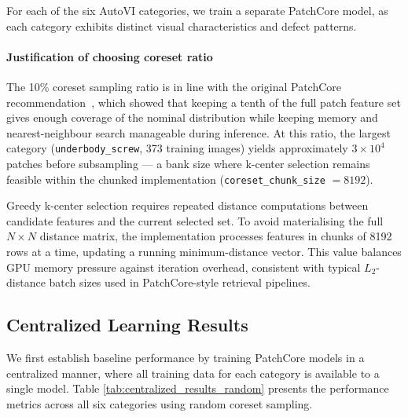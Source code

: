 \documentclass{article}
\begin{document}
For each of the six AutoVI categories, we train a separate PatchCore model, as each category exhibits distinct visual characteristics and defect patterns.

\paragraph*{Justification of choosing coreset ratio}

The 10\% coreset sampling ratio is in line with the original PatchCore 
recommendation~\citep{Roth2022TotalRecall}, which showed that keeping 
a tenth of the full patch feature set gives enough coverage of the 
nominal distribution while keeping memory and nearest-neighbour search 
manageable during inference. At this ratio, the largest category 
(\texttt{underbody\_screw}, 373 training images) yields approximately 
$3 \times 10^4$ patches before subsampling --- a bank size where 
k-center selection remains feasible within the chunked implementation 
(\texttt{coreset\_chunk\_size} $= 8192$).

Greedy k-center selection requires repeated distance computations 
between candidate features and the current selected set. To avoid 
materialising the full $N \times N$ distance matrix, the implementation 
processes features in chunks of 8192 rows at a time, updating a 
running minimum-distance vector. This value balances GPU memory 
pressure against iteration overhead, consistent with typical 
$L_2$-distance batch sizes used in PatchCore-style retrieval pipelines.

\subsection{Centralized Learning Results}

We first establish baseline performance by training PatchCore models in a centralized manner, where all training data for each category is available to a single model. Table \ref{tab:centralized_results_random} presents the performance metrics across all six categories using random coreset sampling.
\end{document}
